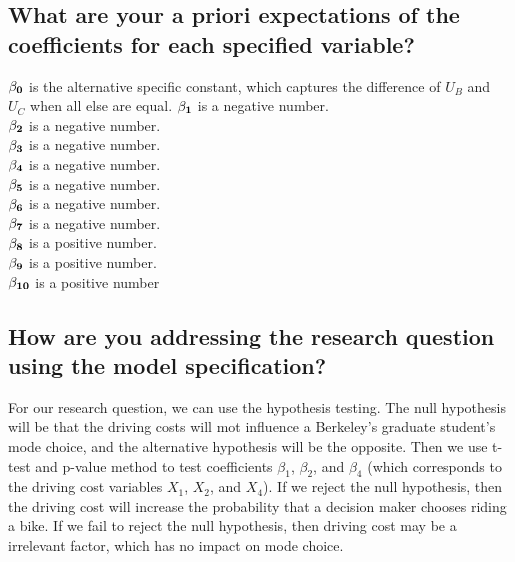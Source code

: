 \documentclass[11pt]{article}
\begin{document}
\subsection{\small{What are your a priori expectations of the coefficients for each specified variable?}}
$\bf{\beta_0}$ is the alternative specific constant, which captures the difference of $U_B$ and $U_C$ when all else are equal.
$\bf{\beta_1}$ is a negative number.\\
$\bf{\beta_2}$ is a negative number.\\
$\bf{\beta_3}$ is a negative number.\\
$\bf{\beta_4}$ is a negative number.\\
$\bf{\beta_5}$ is a negative number.\\
$\bf{\beta_6}$ is a negative number.\\
$\bf{\beta_7}$ is a negative number.\\
$\bf{\beta_8}$ is a positive number.\\
$\bf{\beta_9}$ is a positive number.\\
$\bf{\beta_{10}}$ is a positive number
\subsection{\small{How are you addressing the research question using the model specification?}}
For our research question, we can use the hypothesis testing. The null hypothesis will be that the driving costs will mot influence a Berkeley's graduate student's mode choice, and the alternative hypothesis will be the opposite. Then we use t-test and p-value method to test coefficients $\beta_1$, $\beta_2$, and $\beta_4$ (which corresponds to the driving cost variables $X_1$, $X_2$, and $X_4$). If we reject the null hypothesis, then the driving cost will increase the probability that a decision maker chooses riding a bike. If we fail to reject the null hypothesis, then driving cost may be a irrelevant factor, which has no impact on mode choice. 
\end{document}
